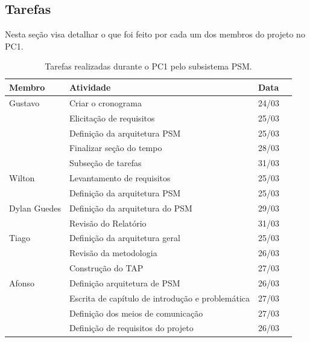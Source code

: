 \subsection{Tarefas}

Nesta seção visa detalhar o que foi feito por cada um dos membros do projeto no PC1.

\begin{table}[h]
  \begin{center}
  \caption{\label{tarefas}Tarefas realizadas durante o PC1 pelo subsistema PSM.}
  \begin{tabular}{|l|l|l|l|}
  \hline
  \textbf{Membro} & \textbf{Atividade} & \textbf{Data} \\ \hline\hline
  Gustavo & Criar o cronograma & 24/03 \\ \hline
   & Elicitação de requisitos & 25/03 \\ \hline
   & Definição da arquitetura PSM & 25/03 \\ \hline
   & Finalizar seção do tempo & 28/03 \\ \hline
   & Subseção de tarefas & 31/03\\ \hline
  Wilton & Levantamento de requisitos & 25/03 \\ \hline
   & Definição da arquitetura PSM & 25/03 \\ \hline
  Dylan Guedes & Definição da arquitetura do PSM & 29/03\\ \hline
   & Revisão do Relatório & 31/03 \\ \hline
  Tiago & Definição da arquitetura geral & 25/03 \\ \hline
   & Revisão da metodologia & 26/03 \\ \hline
   & Construção do TAP & 27/03 \\ \hline
  Afonso & Definição arquitetura de PSM & 26/03 \\ \hline
   & Escrita de capítulo de introdução e problemática & 27/03 \\ \hline
   & Definição dos meios de comunicação & 27/03 \\ \hline
   & Definição de requisitos do projeto & 26/03 \\ \hline
  \end{tabular}
  \end{center}
\end{table}

